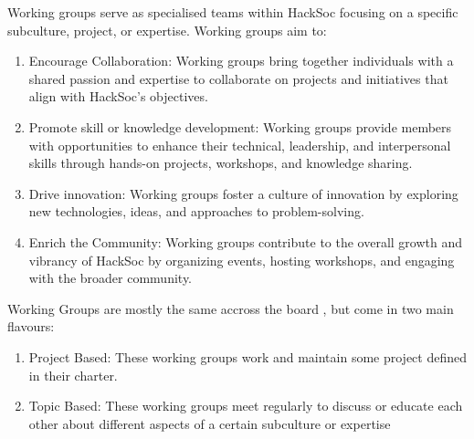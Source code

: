 \begin{clause}
    Working groups serve as specialised teams within HackSoc focusing on a specific subculture, project, or expertise. Working groups aim to:
    \begin{enumerate}
        \item Encourage Collaboration: Working groups bring together individuals with a shared passion and expertise to collaborate on projects and initiatives that align with HackSoc's objectives.
        \item Promote skill or knowledge development: Working groups provide members with opportunities to enhance their technical, leadership, and interpersonal skills through hands-on projects, workshops, and knowledge sharing.
        \item Drive innovation: Working groups foster a culture of innovation by exploring new technologies, ideas, and approaches to problem-solving.
        \item Enrich the Community: Working groups contribute to the overall growth and vibrancy of HackSoc by organizing events, hosting workshops, and engaging with the broader community.
    \end{enumerate}
\end{clause}

\begin{subclause}
    Working Groups are mostly the same accross the board , but come in two main flavours:
    \begin{enumerate}
        \item Project Based: These working groups work and maintain some project defined in their charter.
        \item Topic Based: These working groups meet regularly to discuss or educate each other about different aspects of a certain subculture or expertise
    \end{enumerate}
\end{subclause}

